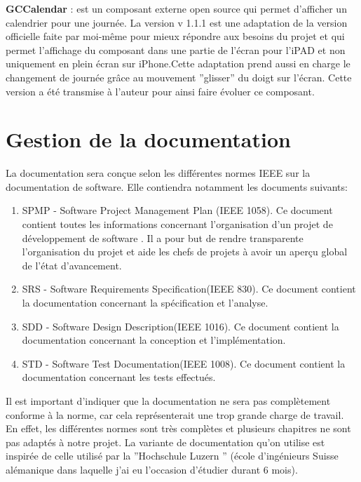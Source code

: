 	 
\textbf{GCCalendar} : est un composant externe open source qui permet d'afficher un calendrier pour une journée.\cite{gcCalendar} La version  v 1.1.1 est une adaptation de la version officielle faite par moi-même pour mieux répondre aux besoins du projet et qui permet l'affichage du composant dans une partie de l'écran pour l'iPAD et non uniquement en plein écran sur iPhone.Cette adaptation prend aussi en charge le changement de journée grâce au mouvement ''glisser'' du doigt sur l'écran. Cette version a été transmise à l'auteur pour ainsi faire évoluer ce composant.

\section{Gestion de la documentation}
 La documentation sera conçue selon les différentes normes IEEE sur la documentation de software. Elle contiendra notamment les documents suivants:

\begin{enumerate}
	\item \gls{SPMP} - Software Project Management Plan (IEEE 1058).  Ce document contient toutes les informations concernant l'organisation d'un projet de développement de software . Il a pour but de rendre transparente l'organisation du projet et aide les chefs de projets à avoir un aperçu global de l'état d'avancement.
	\item \gls{SRS} - Software Requirements Specification(IEEE 830). Ce document contient la documentation concernant la spécification et l'analyse.
	\item \gls{SDD} - Software Design Description(IEEE 1016). Ce document contient la documentation concernant la conception  et l'implémentation.
	\item \gls{STD} - Software Test Documentation(IEEE 1008). Ce document contient la documentation concernant les tests effectués.
\end{enumerate}	

Il est important d'indiquer que la documentation ne sera pas complètement conforme à la norme, car cela représenterait une trop grande charge de travail. En effet, les différentes normes sont très complètes et plusieurs chapitres ne sont pas adaptés à notre projet. La variante de documentation qu'on utilise est inspirée de celle utilisé par la ''Hochschule Luzern '' (école d'ingénieurs Suisse alémanique dans laquelle j'ai eu l'occasion d'étudier durant 6 mois).

